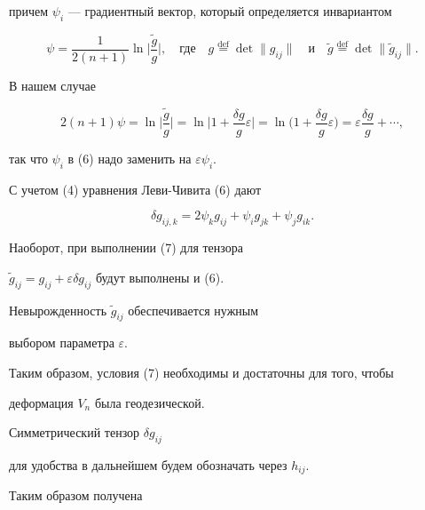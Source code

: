 причем $\psi_i$ --- градиентный вектор, который определяется инвариантом


$$


\psi=\frac 1{2(n+1)}\ln \bigg| \frac{\widetilde{g}}g\bigg|,


\quad\text{где}\quad


g\overset{\mathrm{def}}{=}{}\det\|g_{ij} \|


\quad\text{и}\quad


\widetilde g\overset{\mathrm{def}}{=}{}\det\|\widetilde g_{ij} \|.


$$


В нашем случае 


$$


2(n+1)\psi =\ln \bigg| \frac{\widetilde{g}}g\bigg| =\ln \bigg| 1+


\frac{\delta g}g\varepsilon \bigg| =\ln \bigg(


1+\frac{\delta g}g\varepsilon \bigg)


=\varepsilon \frac{\delta g}g+\dotsb, 


$$


так что $\psi_i$ в (6) надо заменить на $\varepsilon \psi_i$.





С учетом (4) уравнения Леви-Чивита (6) дают 


\begin{equation}


\delta g_{ij,k}=2\psi_kg_{ij}+\psi_ig_{jk}+\psi_jg_{ik}.


\end{equation}


Наоборот, при выполнении (7) для тензора 


$\widetilde{g}_{ij}=g_{ij}+\varepsilon \delta g_{ij}$ будут выполнены и (6).


Невырожденность $\widetilde{g}_{ij}$ обеспечивается нужным


выбором параметра $\varepsilon $.


Таким образом, условия (7) необходимы и достаточны для того, чтобы


деформация $V_n$ была геодезической.


Симметрический тензор $\delta g_{ij}$


для удобства в дальнейшем будем обозначать через $h_{ij}$.





Таким образом получена 





